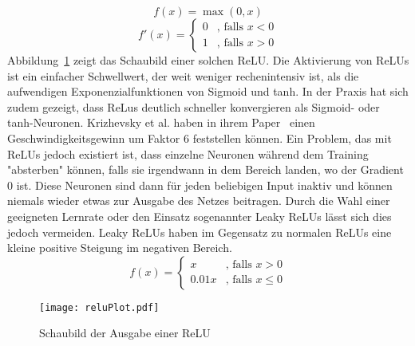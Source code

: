 \begin{equation}
	f(x) = \max(0, x)
\end{equation}
\begin{equation*}
	f'(x) = \begin{cases}
	0 &\text{, falls $x < 0$}\\
	1 &\text{, falls $x > 0$}
	\end{cases}
\end{equation*}
	Abbildung~\ref{reluoutput} zeigt das Schaubild einer solchen ReLU. 
	Die Aktivierung von ReLUs ist ein einfacher Schwellwert, der weit weniger rechenintensiv ist, als die aufwendigen Exponenzialfunktionen von Sigmoid und tanh.
	In der Praxis hat sich zudem gezeigt, dass ReLus deutlich schneller konvergieren als Sigmoid- oder tanh-Neuronen.  
	Krizhevsky et al. haben in ihrem Paper~\cite{NIPS2012_4824} einen Geschwindigkeitsgewinn um Faktor 6 feststellen können.
	Ein Problem, das mit ReLUs jedoch existiert ist, dass einzelne Neuronen während dem Training "absterben" können, falls sie irgendwann in dem Bereich landen, wo der Gradient 0 ist.
	Diese Neuronen sind dann für jeden beliebigen Input inaktiv und können niemals wieder etwas zur Ausgabe des Netzes beitragen.
	Durch die Wahl einer geeigneten Lernrate oder den Einsatz sogenannter Leaky ReLUs lässt sich dies jedoch vermeiden.
	Leaky ReLUs haben im Gegensatz zu normalen ReLUs eine kleine positive Steigung im negativen Bereich.
	\begin{equation}
		f(x) = \begin{cases}
			x &\text{, falls } x  >  0\\
			0.01 x &\text{, falls } x  \leq  0
		\end{cases}
	\end{equation} 
	

	\begin{figure}[h]
		\centering
		\texttt{[image: reluPlot.pdf]}
		\caption{Schaubild der Ausgabe einer ReLU}
		\label{reluoutput}
	\end{figure}




